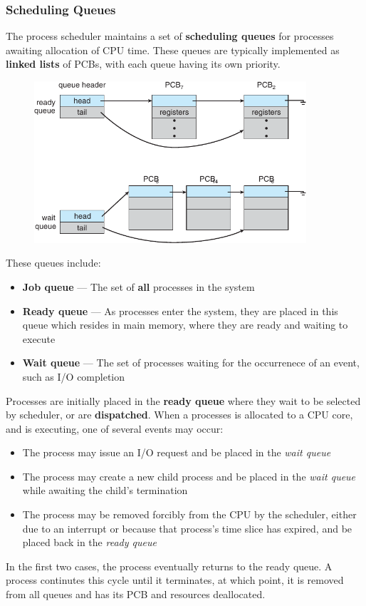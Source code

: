 \documentclass{article}
\begin{document}
\subsubsection{Scheduling Queues}
The process scheduler maintains a set of \textbf{scheduling queues} for
processes awaiting allocation of CPU time. These queues are typically
implemented as \textbf{linked lists} of PCBs, with each queue having
its own priority.
\begin{figure}[H]
    \centering
    \includegraphics[height = 6cm]{figures/scheduler_queues.pdf}
\end{figure}
These queues include:
\begin{itemize}
    \item \textbf{Job queue} --- The set of \textbf{all} processes in the system
    \item \textbf{Ready queue} --- As processes enter the system, they
          are placed in this queue which resides in main memory, where
          they are ready and waiting to execute
    \item \textbf{Wait queue} --- The set of processes waiting for the
          occurrenece of an event, such as I/O completion
\end{itemize}
Processes are initially placed in the \textbf{ready queue} where they
wait to be selected by scheduler, or are \textbf{dispatched}.
When a processes is allocated to a CPU core, and is executing, one of
several events may occur:
\begin{itemize}
    \item The process may issue an I/O request and be placed in the
          \textit{wait queue}
    \item The process may create a new child process and be placed in
          the \textit{wait queue} while awaiting the child's
          termination
    \item The process may be removed forcibly from the CPU by the
          scheduler, either due to an interrupt or because that
          process's time slice has expired, and be placed back in the
          \textit{ready queue}
\end{itemize}
In the first two cases, the process eventually returns to the ready queue.
A process continutes this cycle until it terminates, at which point, it
is removed from all queues and has its PCB and resources deallocated.
\end{document}
